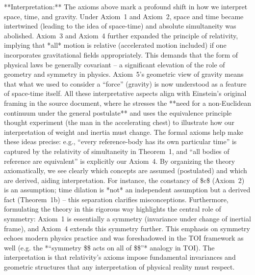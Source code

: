 \documentclass{article}
\begin{document}
**Interpretation:** The axioms above mark a profound shift in how we interpret space, time, and gravity. Under Axiom 1 and Axiom 2, space and time became intertwined (leading to the idea of space-time) and absolute simultaneity was abolished. Axiom 3 and Axiom 4 further expanded the principle of relativity, implying that *all* motion is relative (accelerated motion included) if one incorporates gravitational fields appropriately. This demands that the form of physical laws be generally covariant – a significant elevation of the role of geometry and symmetry in physics. Axiom 5’s geometric view of gravity means that what we used to consider a “force” (gravity) is now understood as a feature of space-time itself. All these interpretative aspects align with Einstein’s original framing in the source document, where he stresses the **need for a non-Euclidean continuum under the general postulate** and uses the equivalence principle thought experiment (the man in the accelerating chest) to illustrate how our interpretation of weight and inertia must change. The formal axioms help make these ideas precise: e.g., “every reference-body has its own particular time” is captured by the relativity of simultaneity in Theorem 1, and “all bodies of reference are equivalent” is explicitly our Axiom 4. By organizing the theory axiomatically, we see clearly which concepts are assumed (postulated) and which are derived, aiding interpretation. For instance, the constancy of \$c\$ (Axiom 2) is an assumption; time dilation is *not* an independent assumption but a derived fact (Theorem 1b) – this separation clarifies misconceptions. Furthermore, formulating the theory in this rigorous way highlights the central role of symmetry: Axiom 1 is essentially a symmetry (invariance under change of inertial frame), and Axiom 4 extends this symmetry further. This emphasis on symmetry echoes modern physics practice and was foreshadowed in the TOI framework as well (e.g. the *“symmetry \$\symtry\$ acts on all of \$\infty\$”* analogy in TOI). The interpretation is that relativity’s axioms impose fundamental invariances and geometric structures that any interpretation of physical reality must respect.
\end{document}
